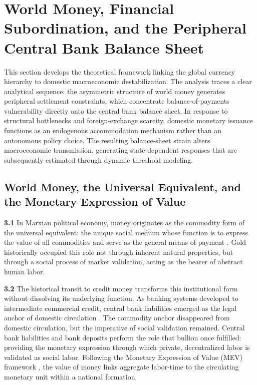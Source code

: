 \section{World Money, Financial Subordination, and the Peripheral Central Bank Balance Sheet}
\label{sec:macro_framework}

This section develops the theoretical framework linking the global currency hierarchy to domestic macroeconomic destabilization. The analysis traces a clear analytical sequence: the asymmetric structure of world money generates peripheral settlement constraints, which concentrate balance-of-payments vulnerability directly onto the central bank balance sheet. In response to structural bottlenecks and foreign-exchange scarcity, domestic monetary issuance functions as an endogenous accommodation mechanism rather than an autonomous policy choice. The resulting balance-sheet strain alters macroeconomic transmission, generating state-dependent responses that are subsequently estimated through dynamic threshold modeling.

\subsection{World Money, the Universal Equivalent, and the Monetary Expression of Value}
\label{sec:B1_worldmoney_mev}

\textbf{3.1} In Marxian political economy, money originates as the commodity form of the universal equivalent: the unique social medium whose function is to express the value of all commodities and serve as the general means of payment \citep[\S3.1]{Basu2022}. Gold historically occupied this role not through inherent natural properties, but through a social process of market validation, acting as the bearer of abstract human labor. 

\textbf{3.2} The historical transit to credit money transforms this institutional form without dissolving its underlying function. As banking systems developed to intermediate commercial credit, central bank liabilities emerged as the legal anchor of domestic circulation \citep[\S3.2.3]{Basu2022}. The commodity anchor disappeared from domestic circulation, but the imperative of social validation remained. Central bank liabilities and bank deposits perform the role that bullion once fulfilled: providing the monetary expression through which private, decentralized labor is validated as social labor. Following the Monetary Expression of Value (MEV) framework \citep{Foley1982,Basu2022}, the value of money links aggregate labor-time to the circulating monetary unit within a national formation.

